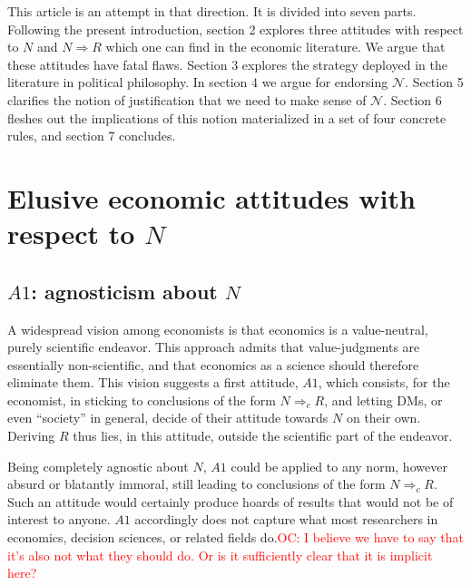 \documentclass[preprint, french, english, 11pt, authoryear]{elsarticle}%
\newcommand{\protectforpdf}[1]{\texorpdfstring{\ensuremath{#1}}{#1}}
\newcommand{\commentOC}[1]{\textcolor{red}{OC: #1}}
\newcommand{\adv}{\mathscr{N}}
\begin{document}
This article is an attempt in that direction. It is divided into seven parts. Following the present introduction, section 2 explores three attitudes with respect to $N$ and $N ⇒ R$ which one can find in the economic literature. We argue that these attitudes have fatal flaws. Section 3 explores the strategy deployed in the literature in political philosophy. In section 4 we argue for endorsing $\adv$. Section 5 clarifies the notion of justification that we need to make sense of $\adv$. Section 6 fleshes out the implications of this notion materialized in a set of four concrete rules, and section 7 concludes.

\section{Elusive economic attitudes with respect to \protectforpdf{N}}
\subsection{\protectforpdf{A1}: agnosticism about \protectforpdf{N}}
A widespread vision among economists is that economics is a value-neutral, purely scientific endeavor. This approach admits that value-judgments are essentially non-scientific, and that economics as a science should therefore eliminate them. This vision suggests a first attitude, $A1$, which consists, for the economist, in sticking to conclusions of the form $N ⇒_c R$, and letting \acp{DM}, or even “society” in general, decide of their attitude towards $N$ on their own. Deriving $R$ thus lies, in this attitude, outside the scientific part of the endeavor. 

Being completely agnostic about $N$, $A1$ could be applied to any norm, however absurd or blatantly immoral, still leading to conclusions of the form $N ⇒_c R$. Such an attitude would certainly produce hoards of results that would not be of interest to anyone. $A1$ accordingly does not capture what most researchers in economics, decision sciences, or related fields do.\commentOC{I believe we have to say that it’s also not what they should do. Or is it sufficiently clear that it is implicit here?}
\end{document}
